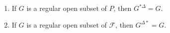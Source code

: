 \begin{enumerate}
\item If $G$ is a regular open subset of $P$, then $G^{*\Delta} = G$.
\item If $G$ is a regular open subset of $\mathcal{F}$, then $G^{\Delta*} = G$.
\end{enumerate}
